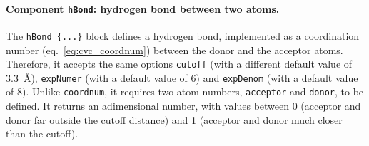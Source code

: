\paragraph*{Component \texttt{hBond}: hydrogen bond between two
  atoms.}  The \texttt{hBond \{...\}} block defines a hydrogen
bond, implemented as a coordination number (eq.~\ref{eq:cvc_coordnum})
between the donor and the acceptor atoms.  Therefore, it accepts the
same options \texttt{cutoff} (with a different default value of
3.3~\AA{}), \texttt{expNumer} (with a default value of 6) and
\texttt{expDenom} (with a default value of 8).  Unlike
\texttt{coordnum}, it requires two atom numbers, \texttt{acceptor} and
\texttt{donor}, to be defined.  It returns an adimensional number,
with values between 0 (acceptor and donor far outside the cutoff
distance) and 1 (acceptor and donor much closer than the cutoff).



